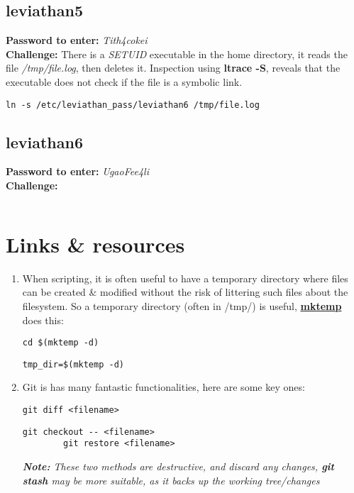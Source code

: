 \documentclass[a4paper]{article}
\newcommand{\pass}[1]{\textbf{Password to enter:} \textit{#1}\\}
\newcommand{\chall}{\textbf{Challenge:} }
\newcommand{\note}[1]{\textit{\textbf{Note:} #1}\\}
\begin{document}
\subsection*{leviathan5}
\pass{Tith4cokei}
\chall There is a \textit{SETUID} executable in the home directory, it reads the file \textit{/tmp/file.log}, then deletes it. Inspection using \textbf{ltrace -S}, reveals that the executable does not check if the file is a symbolic link.
\begin{lstlisting}[deletekeywords={file}]
ln -s /etc/leviathan_pass/leviathan6 /tmp/file.log
\end{lstlisting}

\subsection*{leviathan6}
\pass{UgaoFee4li}
\chall 
\begin{lstlisting}
\end{lstlisting}




\section*{Links \& resources}
\begin{enumerate}

\item When scripting, it is often useful to have a temporary directory where files can be created \& modified without the risk of littering such files about the filesystem. So a temporary directory (often in /tmp/) is useful, \href{https://code-maven.com/create-temporary-directory-on-linux-using-bash}{\textbf{mktemp}} does this:
	\begin{lstlisting}[title=move to the new temporary directory]
	cd $(mktemp -d)
	\end{lstlisting}
	\begin{lstlisting}[title=store the new temporary directory path]
	tmp_dir=$(mktemp -d)
	\end{lstlisting}
	
\item Git is has many fantastic functionalities, here are some key ones:
	\begin{lstlisting}[title=compare working tree with commited version]
		git diff <filename> 
	\end{lstlisting}
	\begin{lstlisting}[title=reset working tree file to the commited version]
		git checkout -- <filename>
		git restore <filename>
	\end{lstlisting}
	\note{These two methods are destructive, and discard any changes, \textbf{git stash} may be more suitable, as it backs up the working tree/changes}
\end{enumerate}
\end{document}
